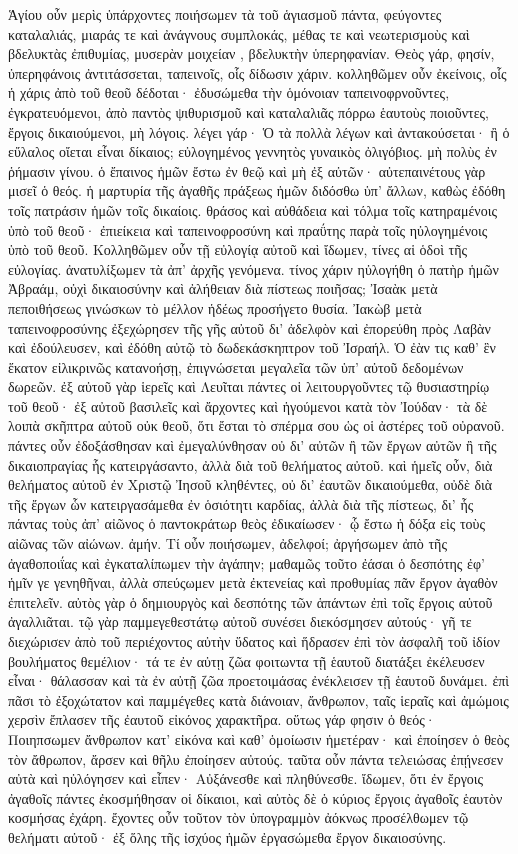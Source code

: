Ἁγίου οὖν μερὶς ὑπάρχοντες ποιήσωμεν τὰ τοῦ ἁγιασμοῦ πάντα, φεύγοντες καταλαλιάς, μιαράς τε καὶ ἀνάγνους συμπλοκάς, μέθας τε καὶ νεωτερισμοὺς καὶ βδελυκτὰς ἐπιθυμίας, μυσερὰν μοιχείαν , βδελυκτὴν ὑπερηφανίαν. Θεὸς γάρ, φησίν, ὐπερηφάνοις ἀντιτάσσεται, ταπεινοῖς, οἷς δίδωσιν χάριν. κολληθῶμεν οὖν ἐκείνοις, οἷς ἡ χάρις ἀπὸ τοῦ θεοῦ δέδοται· ἐδυσώμεθα τὴν ὁμόνοιαν ταπεινοφρνοῦντες, ἐγκρατευόμενοι, ἀπὸ παντὸς ψιθυρισμοῦ καὶ καταλαλιᾶς πόρρω ἑαυτοὺς ποιοῦντες, ἔργοις δικαιούμενοι, μὴ λόγοις. λέγει γάρ· Ὁ τὰ πολλὰ λέγων καὶ ἀντακούσεται· ἢ ὁ εὔλαλος οἴεται εἶναι δίκαιος; εὐλογημένος γεννητὸς γυναικὸς ὀλιγόβιος. μὴ πολὺς ἐν ῥήμασιν γίνου. ὁ ἔπαινος ἡμῶν ἔστω ἐν θεῷ καὶ μὴ ἐξ αὐτῶν· αὐτεπαινέτους γὰρ μισεῖ ὁ θεός. ἡ μαρτυρία τῆς ἀγαθῆς πράξεως ἡμῶν διδόσθω ὑπ’ ἄλλων, καθὼς ἐδόθη τοῖς πατράσιν ἡμῶν τοῖς δικαίοις. θράσος καὶ αὐθάδεια καὶ τόλμα τοῖς κατηραμένοις ὑπὸ τοῦ θεοῦ· ἐπιείκεια καὶ ταπεινοφροσύνη καὶ πραΰτης παρὰ τοῖς ηὐλογημένοις ὑπὸ τοῦ θεοῦ.
Κολληθῶμεν οὖν τῇ εὐλογίᾳ αὐτοῦ καὶ ἴδωμεν, τίνες αἱ ὁδοὶ τῆς εὐλογίας. ἀνατυλίξωμεν τὰ ἀπ’ ἀρχῆς γενόμενα. τίνος χάριν ηὐλογήθη ὁ πατὴρ ἡμῶν Ἀβραάμ, οὐχὶ δικαιοσύνην καὶ ἀλήθειαν διὰ πίστεως ποιῆσας; Ἰσαὰκ μετὰ πεποιθήσεως γινώσκων τὸ μέλλον ἡδέως προσήγετο θυσία. Ἰακὼβ μετὰ ταπεινοφροσύνης ἐξεχώρησεν τῆς γῆς αὐτοῦ δι’ ἀδελφὸν καὶ ἐπορεύθη πρὸς Λαβὰν καὶ ἐδούλευσεν, καὶ ἐδόθη αὐτῷ τὸ δωδεκάσκηπτρον τοῦ Ἰσραήλ.
Ὁ ἐὰν τις καθ’ ἓν ἕκατον εἰλικρινῶς κατανοήσῃ, ἐπιγνώσεται μεγαλεῖα τῶν ὑπ’ αὐτοῦ δεδομένων δωρεῶν. ἐξ αὐτοῦ γὰρ ἱερεῖς καὶ Λευῖται πάντες οἱ λειτουργοῦντες τῷ θυσιαστηρίῳ τοῦ θεοῦ· ἐξ αὐτοῦ βασιλεῖς καὶ ἄρχοντες καὶ ἡγούμενοι κατὰ τὸν Ἰούδαν· τὰ δὲ λοιπὰ σκῆπτρα αὐτοῦ οὐκ θεοῦ, ὅτι ἔσται τὸ σπέρμα σου ὡς οἱ ἀστέρες τοῦ οὐρανοῦ. πάντες οὖν ἐδοξάσθησαν καὶ ἐμεγαλύνθησαν οὐ δι’ αὐτῶν ἢ τῶν ἔργων αὐτῶν ἢ τῆς δικαιοπραγίας ἧς κατειργάσαντο, ἀλλὰ διὰ τοῦ θελήματος αὐτοῦ. καὶ ἡμεῖς οὖν, διὰ θελήματος αὐτοῦ ἐν Χριστῷ Ἰησοῦ κληθέντες, οὐ δι’ ἑαυτῶν δικαιούμεθα, οὐδὲ διὰ τῆς ἔργων ὧν κατειργασάμεθα ἐν ὁσιότητι καρδίας, ἀλλὰ διὰ τῆς πίστεως, δι’ ἧς πάντας τοὺς ἀπ’ αἰῶνος ὁ παντοκράτωρ θεὸς ἐδικαίωσεν· ᾧ ἔστω ἡ δόξα εἰς τοὺς αἰῶνας τῶν αἰώνων. ἀμήν.
Τί οὖν ποιήσωμεν, ἀδελφοί; ἀργήσωμεν ἀπὸ τῆς ἀγαθοποιΐας καὶ ἐγκαταλίπωμεν τὴν ἀγάπην; μαθαμῶς τοῦτο ἐάσαι ὁ δεσπότης ἐφ’ ἡμῖν γε γενηθῆναι, ἀλλὰ σπεύςωμεν μετὰ ἐκτενείας καὶ προθυμίας πᾶν ἔργον ἀγαθὸν ἐπιτελεῖν. αὐτὸς γὰρ ὁ δημιουργὸς καὶ δεσπότης τῶν ἁπάντων ἐπὶ τοῖς ἔργοις αὐτοῦ ἀγαλλιᾶται. τῷ γὰρ παμμεγεθεστάτῳ αὐτοῦ συνέσει διεκόσμησεν αὐτούς· γῆ τε διεχώρισεν ἀπὸ τοῦ περιέχοντος αὐτὴν ὕδατος καὶ ἥδρασεν ἐπὶ τὸν ἀσφαλῆ τοῦ ἰδίον βουλήματος θεμέλιον· τά τε ἐν αὐτῃ ζῶα φοιτωντα τῇ ἑαυτοῦ διατάξει ἐκέλευσεν εἶναι· θάλασσαν καὶ τὰ ἐν αὐτῇ ζῶα προετοιμάσας ἐνέκλεισεν τῇ ἑαυτοῦ δυνάμει. ἐπὶ πᾶσι τὸ ἐξοχώτατον καὶ παμμέγεθες κατὰ διάνοιαν, ἄνθρωπον, ταῖς ἱεραῖς καὶ ἀμώμοις χερσὶν ἔπλασεν τῆς ἐαυτοῦ εἰκόνος χαρακτῆρα. οὕτως γάρ φησιν ὁ θεός· Ποιηπσωμεν ἄνθρωπον κατ’ εἰκόνα καὶ καθ’ ὁμοίωσιν ἡμετέραν· καὶ ἐποίησεν ὁ θεὸς τὸν ἄθρωπον, ἄρσεν καὶ θῆλυ ἐποίησεν αὐτούς. ταῦτα οὖν πάντα τελειώσας ἐπῄνεσεν αὐτὰ καὶ ηὐλόγησεν καὶ εἶπεν· Αὐξάνεσθε καὶ πληθύνεσθε. ἴδωμεν, ὅτι ἐν ἔργοις ἀγαθοῖς πάντες ἐκοσμήθησαν οἱ δίκαιοι, καὶ αὐτὸς δὲ ὁ κύριος ἔργοις ἀγαθοῖς ἑαυτὸν κοσμήσας ἐχάρη. ἔχοντες οὖν τοῦτον τὸν ὑπογραμμὸν ἀόκνως προσέλθωμεν τῷ θελήματι αὐτοῦ· ἐξ ὅλης τῆς ἰσχύος ἡμῶν ἐργασώμεθα ἔργον δικαιοσύνης.
